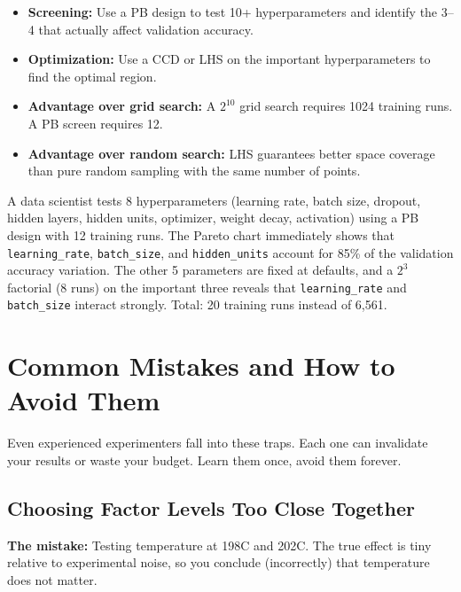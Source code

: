 \documentclass[11pt]{book}
\begin{document}
\begin{itemize}[nosep]
\item \textbf{Screening:} Use a PB design to test 10+ hyperparameters and
      identify the 3--4 that actually affect validation accuracy.
\item \textbf{Optimization:} Use a CCD or LHS on the important hyperparameters
      to find the optimal region.
\item \textbf{Advantage over grid search:} A $2^{10}$ grid search requires
      1024 training runs. A PB screen requires 12.
\item \textbf{Advantage over random search:} LHS guarantees better space coverage
      than pure random sampling with the same number of points.
\end{itemize}

\begin{example}
A data scientist tests 8 hyperparameters (learning rate, batch size, dropout,
hidden layers, hidden units, optimizer, weight decay, activation) using a PB
design with 12 training runs. The Pareto chart immediately shows that
\texttt{learning\_rate}, \texttt{batch\_size}, and \texttt{hidden\_units}
account for 85\% of the validation accuracy variation. The other 5 parameters
are fixed at defaults, and a $2^3$ factorial (8 runs) on the important three
reveals that \texttt{learning\_rate} and \texttt{batch\_size} interact strongly.
Total: 20 training runs instead of 6,561.
\end{example}


\chapter{Common Mistakes and How to Avoid Them}

Even experienced experimenters fall into these traps. Each one can invalidate
your results or waste your budget. Learn them once, avoid them forever.

\section{Choosing Factor Levels Too Close Together}

\textbf{The mistake:} Testing temperature at 198\textdegree C and
202\textdegree C. The true effect is tiny relative to experimental noise, so
you conclude (incorrectly) that temperature does not matter.
\end{document}
